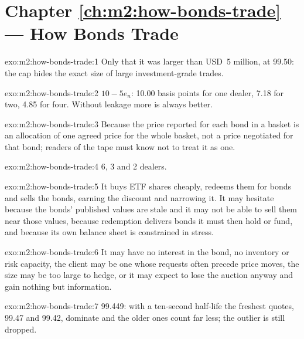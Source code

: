 \section*{Chapter \ref{ch:m2:how-bonds-trade} --- How Bonds Trade}

\begin{solution}{exo:m2:how-bonds-trade:1}
Only that it was larger than USD~5 million, at 99.50: the cap hides the exact size of
large investment-grade trades.
\end{solution}

\begin{solution}{exo:m2:how-bonds-trade:2}
$10 - 5e_n$: 10.00 basis points for one dealer, 7.18 for two, 4.85 for four. Without
leakage more is always better.
\end{solution}

\begin{solution}{exo:m2:how-bonds-trade:3}
Because the price reported for each bond in a basket is an allocation of one agreed
price for the whole basket, not a price negotiated for that bond; readers of the tape
must know not to treat it as one.
\end{solution}

\begin{solution}{exo:m2:how-bonds-trade:4}
6, 3 and 2 dealers.
\end{solution}

\begin{solution}{exo:m2:how-bonds-trade:5}
It buys ETF shares cheaply, redeems them for bonds and sells the bonds, earning the
discount and narrowing it. It may hesitate because the bonds' published values are
stale and it may not be able to sell them near those values, because redemption
delivers bonds it must then hold or fund, and because its own balance sheet is
constrained in stress.
\end{solution}

\begin{solution}{exo:m2:how-bonds-trade:6}
It may have no interest in the bond, no inventory or risk capacity, the client may
be one whose requests often precede price moves, the size may be too large to hedge,
or it may expect to lose the auction anyway and gain nothing but information.
\end{solution}

\begin{solution}{exo:m2:how-bonds-trade:7}
99.449: with a ten-second half-life the freshest quotes, 99.47 and 99.42, dominate and
the older ones count far less; the outlier is still dropped.
\end{solution}

